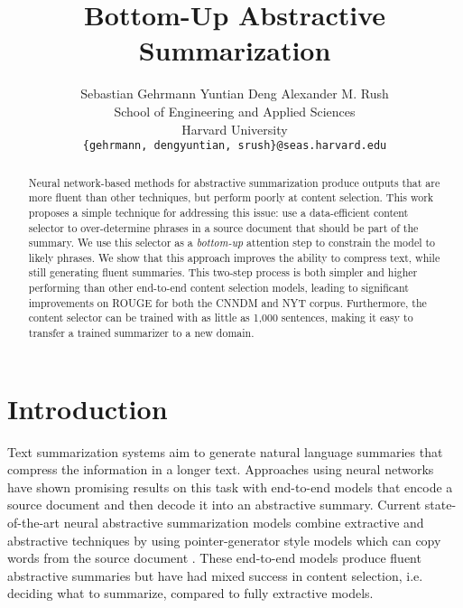 \documentclass[11pt,a4paper]{article}
\title{Bottom-Up Abstractive Summarization}
\author{Sebastian Gehrmann \quad \quad \quad Yuntian Deng \quad \quad \quad Alexander M. Rush \\
  School of Engineering and Applied Sciences \\
  Harvard University\\
  {\tt \{gehrmann, dengyuntian, srush\}@seas.harvard.edu}}
\date{}
\begin{document}
\maketitle
\begin{abstract}
Neural network-based methods for abstractive summarization produce outputs that are more fluent than other techniques, but perform poorly at content selection. This work proposes a simple technique for addressing this issue: use a data-efficient content selector to 
over-determine phrases in a source document that should be part of the summary. We use this selector as a \textit{bottom-up} attention step to constrain the model to likely phrases. We show that this approach improves the ability to compress text, while still generating fluent summaries. This two-step process is both simpler and higher performing than other end-to-end content selection models, leading to significant improvements on ROUGE for both the  \acrshort{CNNDM} and NYT corpus. Furthermore, the content selector can be trained with as little as 1,000 sentences, making it easy to transfer a trained summarizer to a new domain.
\end{abstract}

\section{Introduction}

Text summarization systems aim to generate natural language summaries that compress the information in a longer text. Approaches 
using neural networks have shown promising results on this task with end-to-end models that encode a source document and then decode it into an abstractive summary. Current state-of-the-art neural abstractive summarization models combine extractive and abstractive techniques by using  pointer-generator style models which can copy words from the source document \citep{gu2016incorporating,see2017get}. 
These end-to-end models produce fluent abstractive summaries but have had mixed success in content selection, i.e. deciding what to summarize, compared to fully extractive models.
\end{document}
